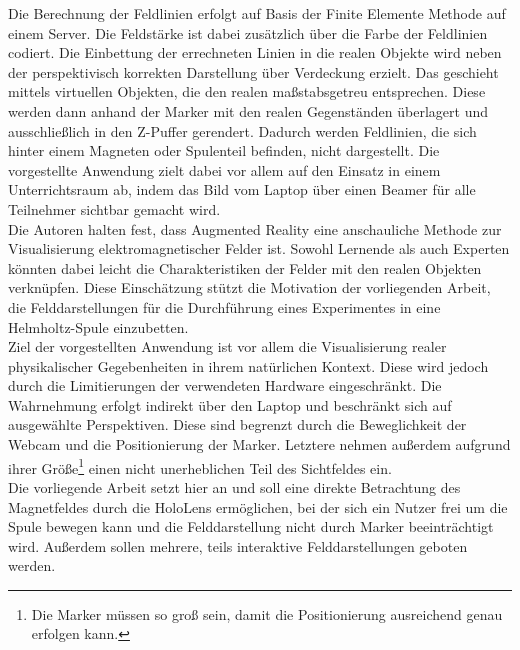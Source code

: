 Die Berechnung der Feldlinien erfolgt auf Basis der Finite Elemente Methode auf einem Server. Die Feldstärke ist dabei zusätzlich über die Farbe der Feldlinien codiert. Die Einbettung der errechneten Linien in die realen Objekte wird neben der perspektivisch korrekten Darstellung über Verdeckung erzielt. Das geschieht mittels  virtuellen Objekten, die den realen maßstabsgetreu entsprechen. Diese werden dann anhand der Marker mit den realen Gegenständen überlagert und ausschließlich in den Z-Puffer gerendert. Dadurch werden Feldlinien, die sich hinter einem Magneten oder Spulenteil befinden, nicht dargestellt. Die vorgestellte Anwendung zielt dabei vor allem auf den Einsatz in einem Unterrichtsraum ab, indem das Bild vom Laptop über einen Beamer für alle Teilnehmer sichtbar gemacht wird.\\

Die Autoren halten fest, dass Augmented Reality eine anschauliche Methode zur Visualisierung elektromagnetischer Felder ist. Sowohl Lernende als auch Experten könnten dabei leicht die Charakteristiken der Felder mit den realen Objekten verknüpfen. Diese Einschätzung stützt die Motivation der vorliegenden Arbeit, die Felddarstellungen für die Durchführung eines Experimentes in eine Helmholtz-Spule einzubetten.\\

Ziel der vorgestellten Anwendung ist vor allem die Visualisierung realer physikalischer Gegebenheiten in ihrem natürlichen Kontext. Diese wird jedoch durch die Limitierungen der verwendeten Hardware eingeschränkt. Die Wahrnehmung erfolgt indirekt über den Laptop und beschränkt sich auf ausgewählte Perspektiven. Diese sind begrenzt durch die Beweglichkeit der Webcam und die Positionierung der Marker. Letztere nehmen außerdem aufgrund ihrer Größe\footnote{Die Marker müssen so groß sein, damit die Positionierung ausreichend genau erfolgen kann.} einen nicht unerheblichen Teil des Sichtfeldes ein.\\

Die vorliegende Arbeit setzt hier an und soll eine direkte Betrachtung des Magnetfeldes durch die HoloLens ermöglichen, bei der sich ein Nutzer frei um die Spule bewegen kann und die Felddarstellung nicht durch Marker beeinträchtigt wird. Außerdem sollen mehrere, teils interaktive Felddarstellungen geboten werden.\\

